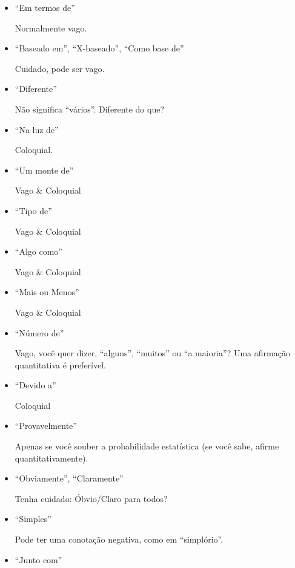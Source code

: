 \begin{itemize}
	\item ``Em termos de''

		\indent Normalmente vago.
		
	\item ``Baseado em'', ``X-baseado'', ``Como base de''

		\indent Cuidado, pode ser vago.
		
	\item ``Diferente''

		\indent	Não significa ``vários''. Diferente do que?
		
	\item ``Na luz de''

		\indent	Coloquial. 
		
	\item ``Um monte de''

		\indent	Vago & Coloquial
		
	\item ``Tipo de''

		\indent	Vago & Coloquial
		
	\item ``Algo como''

		\indent	Vago & Coloquial
		
	\item ``Mais ou Menos'' 

		\indent	Vago & Coloquial
		
	\item ``Número de''

		\indent	Vago, você quer dizer, ``alguns'', ``muitos'' ou ``a maioria''? Uma afirmação quantitativa é preferível.
		
	\item ``Devido a''

		\indent	Coloquial
		
	\item ``Provavelmente''

		\indent	Apenas se você souber a probabilidade estatística (se você sabe, afirme quantitativamente).
		
	\item ``Obviamente'', ``Claramente''

		\indent Tenha cuidado: Óbvio/Claro para todos?
		
	\item ``Simples''

		\indent Pode ter uma conotação negativa, como em ``simplório''.
		
	\item ``Junto com''


\end{itemize}
